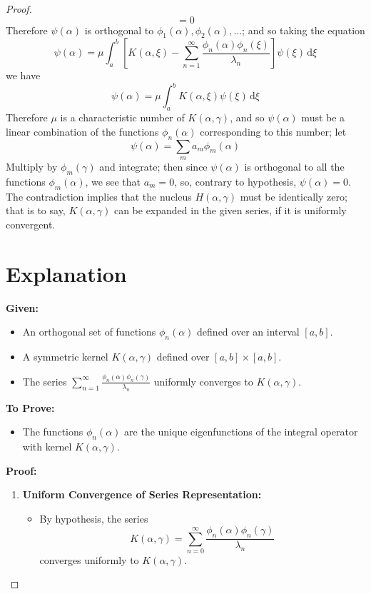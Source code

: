 \documentclass{article}
\begin{document}
\begin{proof}
\begin{equation}
= 0
\end{equation}
Therefore $\psi (\alpha)$ is orthogonal to $\phi_1 (\alpha), \phi_2
(\alpha), \ldots$; and so taking the equation
\begin{equation}
\psi (\alpha) = \mu \int_a^b \left[ K (\alpha, \xi) - \sum_{n =
1}^{\infty} \frac{\phi_n (\alpha) \phi_n (\xi)}{\lambda_n} \right] \psi
(\xi) \, \mathrm{d} \xi
\end{equation}
we have
\begin{equation}
\psi (\alpha) = \mu \int_a^b K (\alpha, \xi) \psi (\xi) \, \mathrm{d} \xi
\end{equation}
Therefore $\mu$ is a characteristic number of $K (\alpha, \gamma)$, and so
$\psi (\alpha)$ must be a linear combination of the functions $\phi_n
(\alpha)$ corresponding to this number; let
\begin{equation}
\psi (\alpha) = \sum_m a_m \phi_m (\alpha)
\end{equation}
Multiply by $\phi_m (\gamma)$ and integrate; then since $\psi (\alpha)$ is
orthogonal to all the functions $\phi_m (\alpha)$, we see that $a_m = 0$,
so, contrary to hypothesis, $\psi (\alpha) = 0$. The contradiction implies
that the nucleus $H (\alpha, \gamma)$ must be identically zero; that is to
say, $K (\alpha, \gamma)$ can be expanded in the given series, if it is
uniformly convergent.

\section{Explanation}

\textbf{Given:}
\begin{itemize}
\item An orthogonal set of functions $\phi_n (\alpha)$ defined over an
interval $[a, b]$.

\item A symmetric kernel $K (\alpha, \gamma)$ defined over $[a, b] \times
[a, b]$.

\item The series $\sum_{n = 1}^{\infty} \frac{\phi_n (\alpha) \phi_n
(\gamma)}{\lambda_n}$ uniformly converges to $K (\alpha, \gamma)$.
\end{itemize}
\textbf{To Prove:}
\begin{itemize}
\item The functions $\phi_n (\alpha)$ are the unique eigenfunctions of the
integral operator with kernel $K (\alpha, \gamma)$.
\end{itemize}
\textbf{Proof:}
\begin{enumerate}
\item \textbf{Uniform Convergence of Series Representation:}
\begin{itemize}
\item By hypothesis, the series
\begin{equation}
K (\alpha, \gamma) = \sum_{n = 0}^{\infty} \frac{\phi_n (\alpha)
\phi_n (\gamma)}{\lambda_n}
\end{equation}
converges uniformly to $K (\alpha, \gamma)$.


\end{itemize}
\end{enumerate}
\end{proof}
\end{document}
